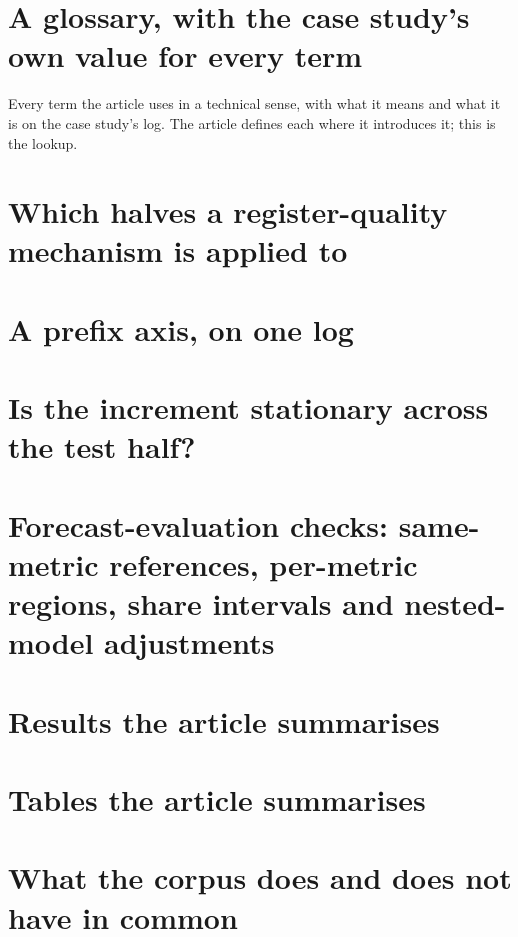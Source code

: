 \section{A glossary, with the case study's own value for every term}
\label{app:glossary}
Every term the article uses in a technical sense, with what it means and what
it is on the case study's log. The article defines each where it introduces
it; this is the lookup.


\section{Which halves a register-quality mechanism is applied to}
\label{app:degrade}


\section{A prefix axis, on one log}
\label{app:prefix}


\section{Is the increment stationary across the test half?}
\label{app:drift}


\section{Forecast-evaluation checks: same-metric references, per-metric regions, share intervals and nested-model adjustments}
\label{app:ijfchecks}


\section{Results the article summarises}
\label{app:secondary}


\section{Tables the article summarises}
\label{app:tables}


\section{What the corpus does and does not have in common}
\label{app:construct}


